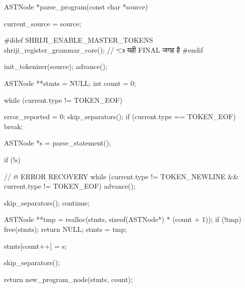\documentclass{article}
\begin{document}
ASTNode *parse_program(const char *source)
{
   current_source = source;

#ifdef SHRIJI_ENABLE_MASTER_TOKENS
    shriji_register_grammar_core();   // 👈 यही FINAL जगह है
#endif

    init_tokenizer(source);
    advance();

    ASTNode **stmts = NULL;
    int count = 0;

    while (current.type != TOKEN_EOF) {
   error_reported = 0;
        skip_separators();
        if (current.type == TOKEN_EOF)
            break;






ASTNode *s = parse_statement();

if (!s) {
    // 🔥 ERROR RECOVERY
    while (current.type != TOKEN_NEWLINE &&
           current.type != TOKEN_EOF) {
        advance();
    }

    skip_separators();
    continue;
}
        ASTNode **tmp = realloc(stmts, sizeof(ASTNode*) * (count + 1));
        if (!tmp) {
            free(stmts);
            return NULL;
        }
        stmts = tmp;

        stmts[count++] = s;

        skip_separators();
    }

    return new_program_node(stmts, count);
}
\end{document}
